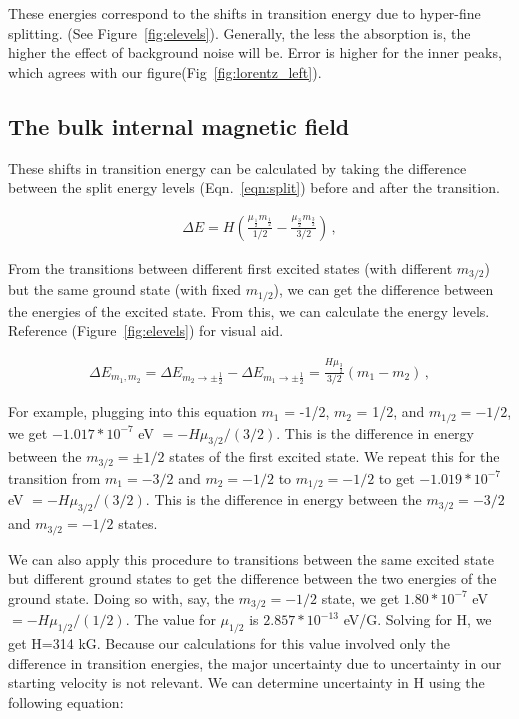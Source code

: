 \documentclass[letterpaper,12pt]{article}
\begin{document}
These energies correspond to the shifts in transition energy due to hyper-fine splitting. (See Figure~\ref{fig:elevels}). Generally, the less the absorption is, the higher the effect of background noise will be. Error is higher for the inner peaks, which agrees with our figure(Fig~\ref{fig:lorentz_left}).  


\subsection{The bulk internal magnetic field}

These shifts in transition energy can be calculated by taking the difference between the split energy levels (Eqn.~\ref{eqn:split}) before and after the transition.

\begin{eqnarray}
        \Delta E = H\left(\frac{\mu_{\frac{1}{2}}m_{\frac{1}{2}}}{1/2} - \frac{\mu_{\frac{3}{2}}m_{\frac{3}{2}}}{3/2}\right) \label{eqn:transition}\,,
\end{eqnarray}

From the transitions between different first excited states (with different $m_{3/2}$) but the same ground state (with fixed $m_{1/2}$), we can get the difference between the energies of the excited state. From this, we can calculate the energy levels. Reference (Figure~\ref{fig:elevels}) for visual aid.

\begin{eqnarray}
        \Delta E_{m_1,m_2} = \Delta E_{m_2\rightarrow\pm\frac{1}{2}} - \Delta E_{m_1\rightarrow\pm\frac{1}{2}} = \frac{H\mu_{\frac{3}{2}}}{3/2}(m_1-m_2) \label{eqn:excitedE}\,,
\end{eqnarray}

For example, plugging into this equation $m_1$ = -1/2, $m_2$ = 1/2, and $m_{1/2}=-1/2$, we get $-1.017*10^{-7}$ eV $=-H\mu_{3/2}/(3/2)$. This is the difference in energy between the $m_{3/2}=\pm1/2$ states of the first excited state. We repeat this for the transition from $m_1=-3/2$ and $m_2=-1/2$ to $m_{1/2}=-1/2$ to get $-1.019*10^{-7}$ eV $=-H\mu_{3/2}/(3/2)$. This is the difference in energy between the $m_{3/2}=-3/2$ and $m_{3/2}=-1/2$ states.

We can also apply this procedure to transitions between the same excited state but different ground states to get the difference between the two energies of the ground state. Doing so with, say, the $m_{3/2}=-1/2$ state, we get $1.80*10^{-7}$ eV $=-H\mu_{1/2}/(1/2)$. The value for $\mu_{1/2}$ is $2.857*10^{-13}$ eV/G. Solving for H, we get H=314 kG. Because our calculations for this value involved only the difference in transition energies, the major uncertainty due to uncertainty in our starting velocity is not relevant. We can determine uncertainty in H using the following equation: 
\end{document}
